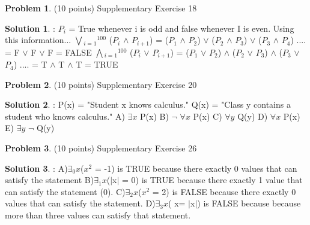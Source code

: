 \documentclass{article}
\theoremstyle{definition}
\newtheorem{problem}{Problem}
\newtheorem*{solution}{Solution}
\begin{document}
\begin{problem} (10 points) 
Supplementary Exercise 18
\end{problem}
\begin{solution}:
\newline
$P_i$ = True whenever i is odd and false whenever I is even.
\newline 
Using this information...
\newline
$\bigvee$$_{i=1}$$^{100}$ ($P_i$ $\wedge$ $P_{i+1}$) = ($P_1$ $\wedge$ $P_2$) $\vee$ ($P_2$ $\wedge$ $P_3$) $\vee$  ($P_3$ $\wedge$ $P_4$) .... = F $\vee$ F $\vee$ F  = FALSE  
\newline
$\bigwedge$$_{i=1}$$^{100}$ ($P_i$ $\vee$ $P_{i+1}$) = ($P_1$ $\vee$ $P_2$) $\wedge$ ($P_2$ $\vee$ $P_3$) $\wedge$  ($P_3$ $\vee$ $P_4$) .... = T $\wedge$ T $\wedge$ T  = TRUE  
\end{solution}

\newpage

\begin{problem} (10 points) 
Supplementary Exercise 20
\end{problem}
\begin{solution}:
\newline
P(x) = "Student x knows calculus."
\newline
Q(x) = "Class y contains a student who knows calculus."
\newline
A) $\exists x$ P(x)
\newline
B) $\neg$ $\forall x$ P(x)
\newline
C) $\forall y$ Q(y)
\newline
D) $\forall x$ P(x)
\newline
E) $\exists y$ $\neg$ Q(y)

\end{solution}

\newpage

\begin{problem} (10 points) 
Supplementary Exercise 26
\end{problem}
\begin{solution}:
\newline
A)$\exists_0 x$($x^2$ = -1) is TRUE because there exactly 0 values that can satisfy the statement
\newline
B)$\exists_1 x$($|$x$|$ = 0) is TRUE because there exactly 1 value that can satisfy the statement (0).
\newline
C)$\exists_2 x$($x^2$ = 2) is FALSE because there exactly 0 values that can satisfy the statement.
\newline
D)$\exists_3 x$( x= $|$x$|$) is FALSE because because more than three values can satisfy that statement.

\end{solution}
\end{document}

